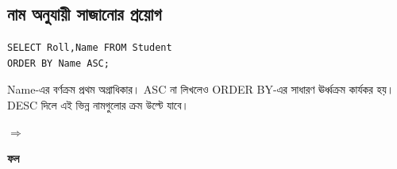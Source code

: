 \subsection{নাম অনুযায়ী সাজানোর প্রয়োগ}
\par\smallskip\noindent\begin{minipage}{\linewidth}
\noindent\begin{minipage}[c]{0.57\linewidth}
\begin{verbatim}
SELECT Roll,Name FROM Student
ORDER BY Name ASC;
\end{verbatim}
\smallskip Name-এর বর্ণক্রম প্রথম অগ্রাধিকার। ASC না লিখলেও ORDER BY-এর সাধারণ ঊর্ধ্বক্রম কার্যকর হয়। DESC দিলে এই ভিন্ন নামগুলোর ক্রম উল্টে যাবে।

\end{minipage}\hfill\begin{minipage}[c]{0.04\linewidth}$\Rightarrow$\end{minipage}\hfill
\begin{minipage}[c]{0.36\linewidth}\raggedright\footnotesize\textbf{ফল}\par\smallskip
{}
\end{minipage}\par\smallskip
\end{minipage}\par


